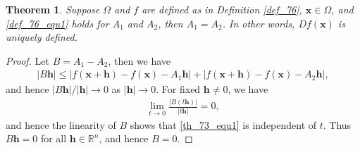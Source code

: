\documentclass[10pt]{book}
\newtheorem{theorem}{Theorem}[chapter]
\theoremstyle{definition}
\numberwithin{equation}{chapter}
\begin{document}
\medskip

\begin{theorem}\label{th_73}
Suppose $\Omega$ and $f$ are defined as in Definition \ref{def_76}, $\mathbf{x} \in \Omega$, and \eqref{def_76_equ1} holds for $A_1$ and $A_2$, then $A_1 = A_2$. In other words, $Df(\mathbf{x})$ is uniquely defined.
\end{theorem}
\begin{proof}
Let $B = A_1 - A_2$, then we have
\begin{align*}
    \left|B\mathbf{h}\right| \leq \left|f(\mathbf{x} + \mathbf{h}) - f(\mathbf{x}) - A_1 \mathbf{h}\right| + \left|f(\mathbf{x} + \mathbf{h}) - f(\mathbf{x}) - A_2 \mathbf{h}\right|,
\end{align*}
and hence $\left|B\mathbf{h}\right|/\left|\mathbf{h}\right| \to 0$ as $\left|\mathbf{h}\right| \to 0$. For fixed $\mathbf{h} \neq 0$, we have
\begin{align}\label{th_73_equ1}
    \lim_{t\to 0} \frac{\left|B(t\mathbf{h}) \right|}{\left|t\mathbf{h} \right|} = 0,
\end{align}
and hence the linearity of $B$ shows that \eqref{th_73_equ1} is independent of $t$. Thus $B\mathbf{h} = 0$ for all $\mathbf{h} \in \mathbb{R}^n$, and hence $B = 0$.
\end{proof}

\medskip
\end{document}

